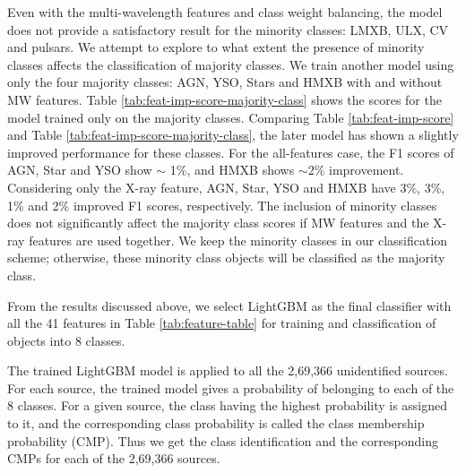 \documentclass[fleqn,usenatbib]{mnras}
\begin{document}
    Even with the multi-wavelength features and class weight balancing, the model does not provide a satisfactory result for the minority classes: LMXB, ULX, CV and pulsars. We attempt to explore to what extent the presence of minority classes affects the classification of majority classes. We train another model using only the four majority classes: AGN, YSO, Stars and HMXB with and without MW features. Table \ref{tab:feat-imp-score-majority-class} shows the scores for the model trained only on the majority classes. Comparing Table \ref{tab:feat-imp-score} and Table \ref{tab:feat-imp-score-majority-class}, the later model has shown a slightly improved performance for these classes. For the all-features case, the F1 scores of AGN, Star and YSO  show $\sim$ 1\%, and HMXB shows $\sim 2\%$ improvement. Considering only the X-ray feature, AGN, Star, YSO and HMXB have 3\%, 3\%, 1\% and 2\% improved F1 scores, respectively. The inclusion of minority classes does not significantly affect the majority class scores if MW features and the X-ray features are used together. We keep the minority classes in our classification scheme; otherwise, these minority class objects will be classified as the majority class.

    From the results discussed above, we select LightGBM as the final classifier with all the 41 features in Table \ref{tab:feature-table} for training and classification of objects into 8 classes. 

   
    
   The trained LightGBM model is applied to all the 2,69,366 unidentified sources. For each source, the trained model gives a probability of belonging to each of the 8 classes. For a given source, the class having the highest probability is assigned to it, and the corresponding class probability is called the class membership probability (CMP). Thus we get the class identification and the corresponding CMPs for each of the 2,69,366 sources.
\end{document}
